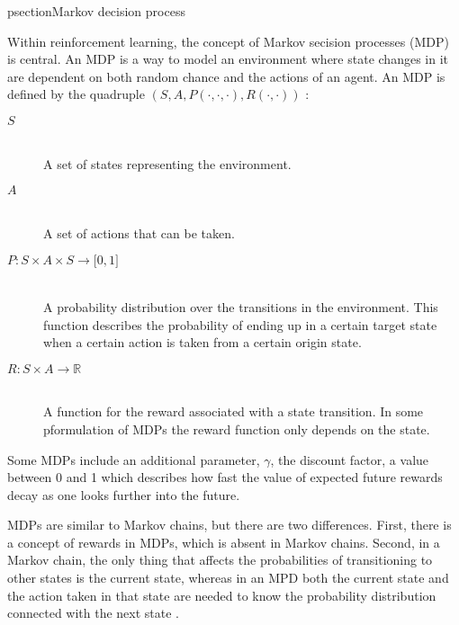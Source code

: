 psection{Markov decision process}

Within reinforcement learning, the concept of Markov secision processes (MDP) is central. An MDP is a way to model an environment where state changes in it are dependent on both random chance and the actions of an agent. An MDP is defined by the quadruple $\left( S, A, P( \cdot , \cdot, \cdot ) , R( \cdot , \cdot ) \right)$ \parencite{altman2002applications}:

\begin{description}
\item[$S$] \hfill \\ 
    A set of states representing the environment.

\item[$A$] \hfill \\ 
    A set of actions that can be taken.

\item[$P \colon S \times A \times S \to \mathbb \lbrack0, 1\rbrack$] \hfill \\ 
    A probability distribution over the transitions in the environment. This
    function describes the probability of ending up in a certain target state
    when a certain action is taken from a certain origin state. 

\item[$R \colon S \times A \to \mathbb{R}$] \hfill \\ 
    A function for the reward associated with a state transition. In some
    pformulation of MDPs the reward function only depends on the state.

\end{description}

Some MDPs include an additional parameter, $\gamma$, the discount factor, a
value between 0 and 1 which describes how fast the value of expected future
rewards decay as one looks further into the future.

MDPs are similar to Markov chains, but there are two differences. First, there
is a concept of rewards in MDPs, which is absent in Markov chains. Second, in a
Markov chain, the only thing that affects the probabilities of transitioning to
other states is the current state, whereas in an MPD both the current state and
the action taken in that state are needed to know the probability distribution
connected with the next state \parencite{altman2002applications}.





